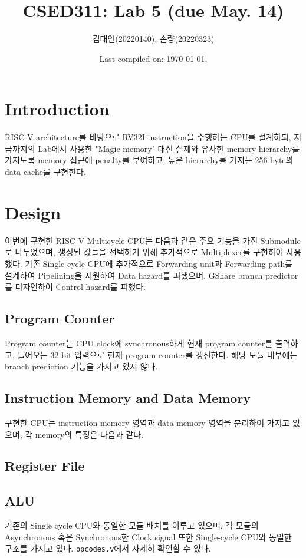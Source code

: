 \documentclass{scrartcl}
\title{CSED311: Lab 5 (due May. 14)}
\author{김태연(20220140), 손량(20220323)}
\date{Last compiled on: \today, \currenttime}
\begin{document}
\maketitle

\section{Introduction}
RISC-V architecture를 바탕으로 RV32I instruction을 수행하는 CPU를 설계하되, 지금까지의 Lab에서 사용한 "Magic memory" 대신
실제와 유사한 memory hierarchy를 가지도록 memory 접근에 penalty를 부여하고, 높은 hierarchy를 가지는 256 byte의 data cache를 구현한다.

\section{Design}
이번에 구현한 RISC-V Multicycle CPU는 다음과 같은 주요 기능을 가진 Submodule로 나누었으며, 생성된 값들을 선택하기 위해
추가적으로 Multiplexer를 구현하여 사용했다. 기존 Single-cycle CPU에 추가적으로 Forwarding unit과 Forwarding path를
설계하여 Pipelining을 지원하여 Data hazard를 피했으며, GShare branch predictor를 디자인하여 Control hazard를 피했다.

\subsection{Program Counter}
Program counter는 CPU clock에 synchronous하게 현재 program counter를 출력하고, 들어오는 32-bit 입력으로 현재 program counter를 갱신한다.
해당 모듈 내부에는 branch prediction 기능을 가지고 있지 않다.

\subsection{Instruction Memory and Data Memory}
구현한 CPU는 instruction memory 영역과 data memory 영역을 분리하여 가지고 있으며, 각 memory의 특징은 다음과 같다.

\subsection{Register File}
\subsection{ALU}
기존의 Single cycle CPU와 동일한 모듈 배치를 이루고 있으며, 각 모듈의 Asynchronous 혹은 Synchronous한 Clock signal
또한 Single-cycle CPU와 동일한 구조를 가지고 있다. \texttt{opcodes.v}에서 자세히 확인할 수 있다.
\end{document}
